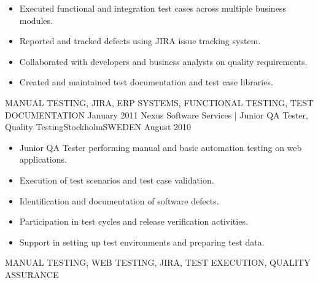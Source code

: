 \begin{experiences}
{\begin{itemize}
                        \item Executed functional and integration test cases across multiple business modules.
                        \item Reported and tracked defects using JIRA issue tracking system.
                        \item Collaborated with developers and business analysts on quality requirements.
                        \item Created and maintained test documentation and test case libraries.
                      \end{itemize}
                    }
                    {MANUAL TESTING, JIRA, ERP SYSTEMS, FUNCTIONAL TESTING, TEST DOCUMENTATION} 
  \emptySeparator   
  \experience
    {January 2011}     {Nexus Software Services | Junior QA Tester, Quality Testing}{Stockholm}{SWEDEN}
    {August 2010}    {
                      \begin{itemize}
                        \item Junior QA Tester performing manual and basic automation testing on web applications.
                        \item Execution of test scenarios and test case validation.
                        \item Identification and documentation of software defects.
                        \item Participation in test cycles and release verification activities.
                        \item Support in setting up test environments and preparing test data.
                      \end{itemize}
                    }
                    {MANUAL TESTING, WEB TESTING, JIRA, TEST EXECUTION, QUALITY ASSURANCE}
  \emptySeparator
\end{experiences}
